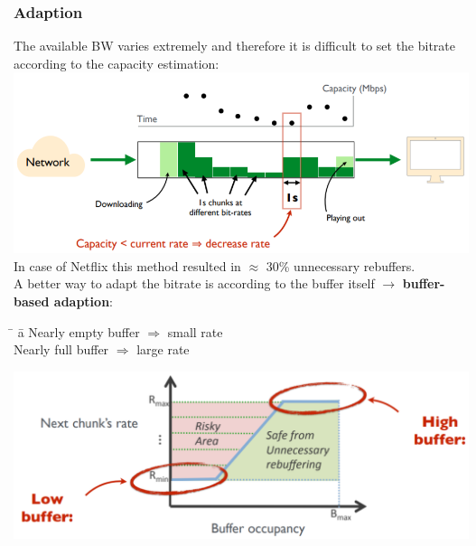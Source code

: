 \documentclass[a4paper, fontsize=8pt, landscape, DIV=1]{scrartcl}
\begin{document}
\begin{multicols*}{4}
		\subsubsection{Adaption}
		The available BW varies extremely and therefore it is difficult to set the bitrate according to the capacity estimation:\\
		\includegraphics[width=\columnwidth]{images/Application_Layer/adaption_capacity.png}
		In case of Netflix this method resulted in $\approx$ 30\% unnecessary rebuffers.\\
		A better way to adapt the bitrate is according to the buffer itself $\rightarrow$ \textbf{buffer-based adaption}:
		\begin{tabbing}
			\hspace{3cm} \= \hspace{1cm} \=  a \kill
			Nearly empty buffer \> $\Rightarrow$ \> small rate \\
			Nearly full buffer \> $\Rightarrow$ \> large rate
		\end{tabbing}
		\includegraphics[width=\columnwidth]{images/Application_Layer/buffer_adaption.png}
		

\end{multicols*}
\end{document}
